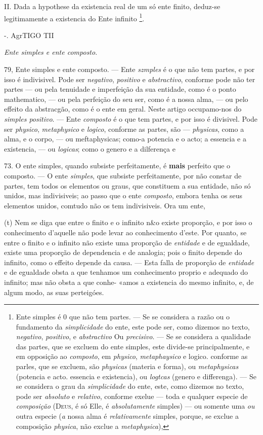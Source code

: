  II. Dada a hypothese da existencia real de um só ente finito, deduz-se legitimamente a existencia do Ente infinito \footnote{Ente simples é 0 que não tem partes. --- Se se considera a razão ou o fundamento da \emph{simplicidade} do ente, este pode ser, como dizemos no texto, \emph{negativo}, \emph{positivo}, e \emph{abstractivo} Ou \emph{precisivo}. --- Se se considera a qualidade das partes, que se excluem do ente simples, este divide-se principalmente, e em opposição ao \emph{composto}, em \emph{physico}, \emph{metaphaysico} e logico. conforme as parles, que se excluem, são \emph{physicas} (materia e forma), ou \emph{metaphysicas} (potencia e acto. essencia e existencia), ou \emph{logtcas} (genero e differenga). --- Se se considera o grau da \emph{simplicidade} do ente, este, como dizemos no texto, pode ser \emph{absoluto} e \emph{relativo}, conforme exelue --- toda e qualquer especie de \emph{composição} (\textsc{Deus}, é só Elle, é \emph{absolutamente} simples) --- ou somente uma \emph{ou} outra especie (\emph{a} nossa alma é \emph{relativamente} simples, porque, se exclue a composição \emph{physica}, não exclue a \emph{metaphysica}),}.

-. AgrTIGO TII

\emph{Ente simples e ente composto}.

79, Ente simples e ente composto. --- Ente \emph{szmples} é o que não tem partes, e por isso é indivisivel. Pode ser \emph{negativo}, \emph{positivo} e \emph{abstractivo}, conforme pode não ter partes --- ou pela tenuidade e imperfeição da sua entidade, como é o ponto mathematico, --- ou pela perfeição do seu ser, como é a nossa alma, --- ou pelo effeito da abstracgão, como é o ente em geral. Neste artigo occupamo-nos do \emph{simples positivo}. --- Ente \emph{composto} é o que tem partes, e por isso é divisivel. Pode ser \emph{physico}, \emph{metaphysico} e \emph{logico}, conforme as partes, são --- \emph{physicas}, como a alma, e o corpo, --- ou meftaphysicas; como-a potencia e o acto; a essencia e a existencia, --- ou \emph{logicas}; como o genero e a dilferença e

73. O ente simples, quando subsiste perfeitamente, é \textbf{mais} perfeito que o composto. --- O ente \emph{simples}, que subsiste perfeitamente, por não constar de partes, tem todos os elementos ou graus, que constituem a sua entidade, não só unidos, mas indivisiveis; ao passo que o ente \emph{composto}, embora tenha os seus elementos unidos, comtudo não os tem indivisiveis. Ora um ente,

(t) Nem se diga que entre o finito e o infinito n\&o existe proporção, e por isso o conhecimento d'aquelle não pode levar ao conhecimento d'este. Por quanto, se entre o finito e o infinito não existe uma proporção de \emph{entidade} e de egualdade, existe uma proporção de dependencia e de analogia; pois o finito depende do infinito, como o effeito depende da causa. --- Esta falla de proporção de \emph{entidade} e de egualdade obsta a que tenhamos um conhecimento proprio e adequado do infinito; mas não obsta a que conhe- «amos a existencia do mesmo infinito, e, de algum modo, as suas perteigóes.

